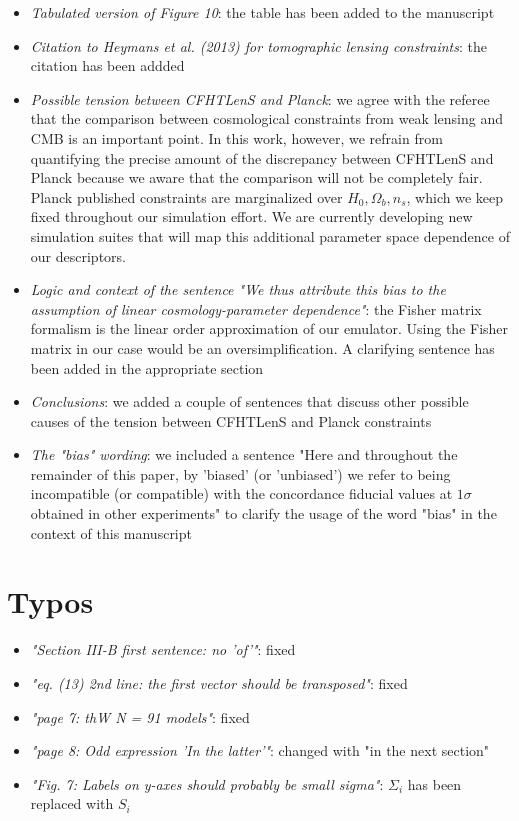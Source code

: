 \documentclass[11pt]{article}
\begin{document}
\begin{itemize}
\item \textit{Tabulated version of Figure 10}: the table has been added to the manuscript
\item \textit{Citation to Heymans et al. (2013) for tomographic lensing constraints}: the citation has been addded
\item \textit{Possible tension between CFHTLenS and Planck}: we agree with the referee that the comparison between cosmological constraints from weak lensing and CMB is an important point. In this work, however, we refrain from quantifying the precise amount of the discrepancy between CFHTLenS and Planck because we aware that the comparison will not be completely fair. Planck published constraints are marginalized over $H_0,\Omega_b,n_s$, which we keep fixed throughout our simulation effort. We are currently developing new simulation suites that will map this additional parameter space dependence of our descriptors.  
\item \textit{Logic and context of the sentence "We thus attribute this bias to the assumption of linear cosmology-parameter dependence"}: the Fisher matrix formalism is the linear order approximation of our emulator. Using the Fisher matrix in our case would be an oversimplification. A clarifying sentence has been added in the appropriate section 
\item \textit{Conclusions}: we added a couple of sentences that discuss other possible causes of the tension between CFHTLenS and Planck constraints
\item \textit{The "bias" wording}: we included a sentence "Here and throughout the remainder of this paper, by 'biased' (or 'unbiased') we refer to being incompatible (or compatible) with the concordance fiducial values at $1\sigma$ obtained in other experiments" to clarify the usage of the word "bias" in the context of this manuscript

\end{itemize}

\section*{Typos}

\begin{itemize}
\item \textit{"Section III-B first sentence: no 'of'"}: fixed
\item \textit{"eq. (13) 2nd line: the first vector should be transposed"}: fixed
\item \textit{"page 7: thW N = 91 models"}: fixed
\item \textit{"page 8: Odd expression 'In the latter'"}: changed with "in the next section"
\item \textit{"Fig. 7: Labels on y-axes should probably be small sigma"}: $\Sigma_i$ has been replaced with $S_i$

\end{itemize}
     
\end{document}
